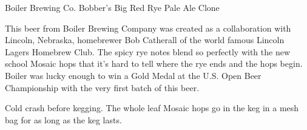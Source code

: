\stylesection{\styleamericanale}

\begin{recipie}{Boiler Brewing Co. Bobber's Big Red Rye Pale Ale Clone}

\begin{aboutblock}
This beer from Boiler Brewing Company was created as a collaboration with Lincoln,
Nebraska, homebrewer Bob Catherall of the world famous Lincoln Lagers Homebrew Club.
The spicy rye notes blend so perfectly with the new school Mosaic hops that it's hard to tell where the rye ends and the hops begin. Boiler was lucky enough to win
a Gold Medal at the U.S. Open Beer Championship with the very first batch of this
beer. \sourceaha
\end{aboutblock}


\begin{methodandtiming}
 
\begin{mashsteps}
\end{mashsteps}

\begin{fermentationsteps}
\end{fermentationsteps}

\begin{directions}
Cold crash before kegging. The whole leaf Mosaic hops go in the keg in a mesh bag
for as long as the keg lasts.
\end{directions}

\end{methodandtiming}

\pagebreak

\begin{ingredientsblock}

\begin{malts}
\end{malts}

\begin{hops}
\end{hops}


\end{ingredientsblock}

\end{recipie}

